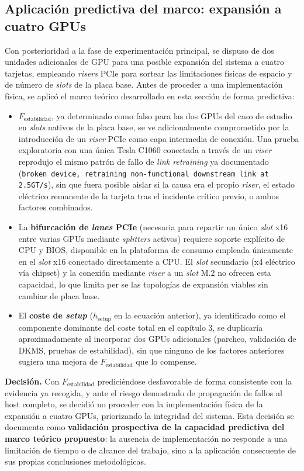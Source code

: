 \subsection{Aplicación predictiva del marco: expansión a cuatro GPUs}

Con posterioridad a la fase de experimentación principal, se dispuso de dos unidades adicionales de GPU para una posible expansión del sistema a cuatro tarjetas, empleando \textit{risers} PCIe para sortear las limitaciones físicas de espacio y de número de \textit{slots} de la placa base. Antes de proceder a una implementación física, se aplicó el marco teórico desarrollado en esta sección de forma predictiva:
\begin{itemize}
    \item \textbf{$F_{\text{estabilidad}}$}, ya determinado como falso para las dos GPUs del caso de estudio en \textit{slots} nativos de la placa base, se ve adicionalmente comprometido por la introducción de un \textit{riser} PCIe como capa intermedia de conexión. Una prueba exploratoria con una única Tesla C1060 conectada a través de un \textit{riser} reprodujo el mismo patrón de fallo de \textit{link retraining} ya documentado (\texttt{broken device, retraining non-functional downstream link at 2.5GT/s}), sin que fuera posible aislar si la causa era el propio \textit{riser}, el estado eléctrico remanente de la tarjeta tras el incidente crítico previo, o ambos factores combinados.
    \item La \textbf{bifurcación de \textit{lanes} PCIe} (necesaria para repartir un único \textit{slot} x16 entre varias GPUs mediante \textit{splitters} activos) requiere soporte explícito de CPU y BIOS, disponible en la plataforma de consumo empleada únicamente en el \textit{slot} x16 conectado directamente a CPU. El \textit{slot} secundario (x4 eléctrico vía chipset) y la conexión mediante \textit{riser} a un \textit{slot} M.2 no ofrecen esta capacidad, lo que limita per se las topologías de expansión viables sin cambiar de placa base.
    \item El \textbf{coste de \textit{setup}} ($h_{\text{setup}}$ en la ecuación anterior), ya identificado como el componente dominante del coste total en el capítulo 3, se duplicaría aproximadamente al incorporar dos GPUs adicionales (parcheo, validación de DKMS, pruebas de estabilidad), sin que ninguno de los factores anteriores sugiera una mejora de $F_{\text{estabilidad}}$ que lo compense.
\end{itemize}
\textbf{Decisión.} Con $F_{\text{estabilidad}}$ prediciéndose desfavorable de forma consistente con la evidencia ya recogida, y ante el riesgo demostrado de propagación de fallos al host completo, se decidió no proceder con la implementación física de la expansión a cuatro GPUs, priorizando la integridad del sistema. Esta decisión se documenta como \textbf{validación prospectiva de la capacidad predictiva del marco teórico propuesto}: la ausencia de implementación no responde a una limitación de tiempo o de alcance del trabajo, sino a la aplicación consecuente de sus propias conclusiones metodológicas.

